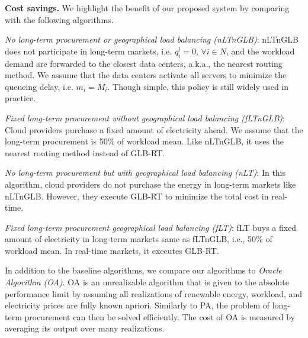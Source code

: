 \textbf{Cost savings.} We highlight the benefit of our proposed system
by comparing with the following algorithms.

\textit{No long-term procurement or geographical load balancing (nLTnGLB)}: nLTnGLB does not participate in long-term markets, i.e. $q^l_i = 0$, $\forall i \in N$, and the workload demand are forwarded to the closest data centers, a.k.a., the nearest routing method. We assume that the data centers activate all servers to minimize the queueing delay, i.e. $m_i=M_i$. Though simple, this policy is still widely used in practice.

\textit{Fixed long-term procurement without geographical load balancing (fLTnGLB)}: Cloud providers purchase a fixed amount of electricity ahead. We assume that the long-term procurement is 50\% of workload mean. Like nLTnGLB, it uses the nearest routing method instead of GLB-RT.

\textit{No long-term procurement but with geographical load balancing (nLT)}: In this algorithm, cloud providers do not purchase the energy in long-term markets like nLTnGLB. However, they execute GLB-RT to minimize the total cost in real-time.

\textit{Fixed long-term procurement geographical load balancing (fLT)}: fLT buys a fixed amount of electricity in long-term markets same as fLTnGLB, i.e., 50\% of workload mean. In real-time markets, it executes GLB-RT.

In addition to the baseline algorithms, we compare our algorithms to \textit{Oracle Algorithm (OA)}. OA is an unrealizable algorithm that is given to the absolute performance limit by assuming all realizations of renewable energy, workload, and electricity prices are fully known apriori. Similarly to PA, the problem of long-term procurement can then be solved efficiently. The cost of OA is measured by averaging its output over many realizations.


